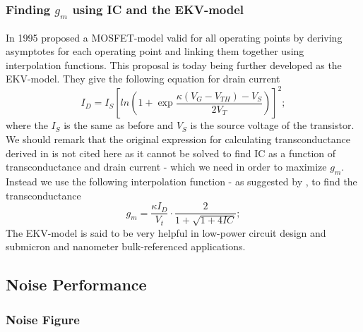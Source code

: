 	\subsubsection{Finding $g_m$ using IC and the EKV-model}\label{subsec:maxim-gm-EKV-model}
	In 1995 \cite{enz1995analytical} proposed a MOSFET-model valid for all operating points by deriving asymptotes for each operating point and linking them together using interpolation functions.
	This proposal is today being further developed as the EKV-model. They give the following equation for drain current
	    \begin{equation} \label{eq:Id-EKV}
	      I_D= I_S[ln(1 + \exp{\frac{\kappa (V_G-V_{TH})-V_S}{2V_T}})]^2;
	    \end{equation}
	where the $I_S$ is the same as before and $V_S$ is the source voltage of the transistor.
	We should remark that the original expression for calculating transconductance derived in \cite{enz1995analytical} is not cited here as it cannot be solved to find IC as a function of transconductance and drain current - which we need in order to maximize $g_m$.
	Instead we use the following interpolation function - as suggested by \cite{EE5720-Harrison-subtreshold}, to find the transconductance
	    \begin{equation} \label{eq:gm-EKV}
	      g_m= \frac{\kappa I_D}{V_t} \cdot \frac{2}{1+ \sqrt{1+4IC}};
	    \end{equation}	
	The EKV-model is said to be very helpful in low-power circuit design\cite{harrison2003low} and submicron and nanometer bulk-referenced applications\cite{shaoxi2010mosfet}.
      
	  
	 
	   
	   
      \subsection{Noise Performance}
	\subsubsection{Noise Figure}
        
        
